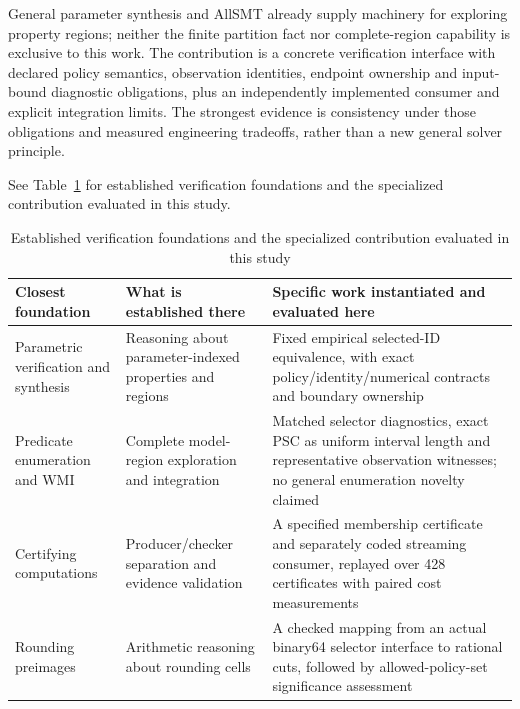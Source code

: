 \documentclass[11pt,a4paper]{article}
\theoremstyle{plain}
\theoremstyle{definition}
\theoremstyle{remark}
\begin{document}
General parameter synthesis and AllSMT already supply machinery for exploring property regions; neither the finite partition fact nor complete-region capability is exclusive to this work. The contribution is a concrete verification interface with declared policy semantics, observation identities, endpoint ownership and input-bound diagnostic obligations, plus an independently implemented consumer and explicit integration limits. The strongest evidence is consistency under those obligations and measured engineering tradeoffs, rather than a new general solver principle.

See Table~\ref{tab:s15} for established verification foundations and the specialized contribution evaluated in this study.

\begin{table}[!htbp]
\caption{Established verification foundations and the specialized contribution evaluated in this study}\label{tab:s15}
\centering
\footnotesize
\setlength{\tabcolsep}{3pt}
\renewcommand{\arraystretch}{1.15}
\begin{tabularx}{\textwidth}{@{} >{\raggedright\arraybackslash}p{3.2cm} >{\raggedright\arraybackslash}X >{\raggedright\arraybackslash}X @{}}
\toprule
\textbf{Closest foundation} & \textbf{What is established there} & \textbf{Specific work instantiated and evaluated here} \\
\midrule
Parametric verification and synthesis \cite{storm2026parametric,junges2024parameter,dehnert2015prophesy} & Reasoning about parameter-indexed properties and regions & Fixed empirical selected-ID equivalence, with exact policy/identity/numerical contracts and boundary ownership \\
Predicate enumeration and WMI \cite{mathsat_api,morettin2017efficient,spallitta2025disjoint} & Complete model-region exploration and integration & Matched selector diagnostics, exact PSC as uniform interval length and representative observation witnesses; no general enumeration novelty claimed \\
Certifying computations \cite{alkassar2013framework,mcconnell2011certifying} & Producer/checker separation and evidence validation & A specified membership certificate and separately coded streaming consumer, replayed over 428 certificates with paired cost measurements \\
Rounding preimages \cite{andrlon2023finding} & Arithmetic reasoning about rounding cells & A checked mapping from an actual binary64 selector interface to rational cuts, followed by allowed-policy-set significance assessment \\
\bottomrule
\end{tabularx}
\end{table}
\FloatBarrier
\end{document}
